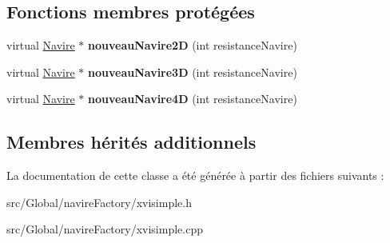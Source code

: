\subsection*{Fonctions membres protégées}
\begin{DoxyCompactItemize}
\item 
virtual \hyperlink{class_navire}{Navire} $\ast$ {\bfseries nouveau\+Navire2D} (int resistance\+Navire)\hypertarget{class_x_v_i_simple_aa9ae845ec0335ec013b9fff7baeb47b6}{}\label{class_x_v_i_simple_aa9ae845ec0335ec013b9fff7baeb47b6}

\item 
virtual \hyperlink{class_navire}{Navire} $\ast$ {\bfseries nouveau\+Navire3D} (int resistance\+Navire)\hypertarget{class_x_v_i_simple_abceb23487d2cd8fa1412e443fc7b818b}{}\label{class_x_v_i_simple_abceb23487d2cd8fa1412e443fc7b818b}

\item 
virtual \hyperlink{class_navire}{Navire} $\ast$ {\bfseries nouveau\+Navire4D} (int resistance\+Navire)\hypertarget{class_x_v_i_simple_a98799db2f7362b65af68e961a98e319d}{}\label{class_x_v_i_simple_a98799db2f7362b65af68e961a98e319d}

\end{DoxyCompactItemize}
\subsection*{Membres hérités additionnels}


La documentation de cette classe a été générée à partir des fichiers suivants \+:\begin{DoxyCompactItemize}
\item 
src/\+Global/navire\+Factory/xvisimple.\+h\item 
src/\+Global/navire\+Factory/xvisimple.\+cpp\end{DoxyCompactItemize}

